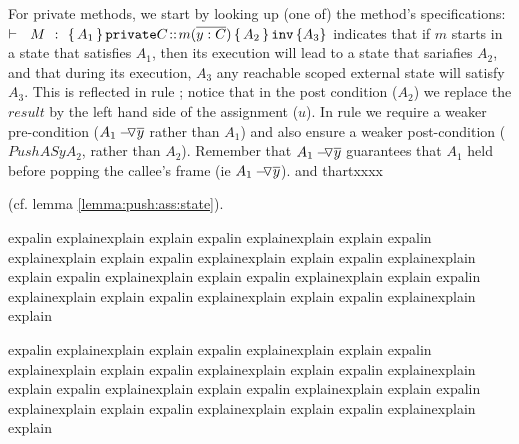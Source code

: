 {%
For private methods, we start by  looking up (one of) the method's specifications: $ \promises  M {\mprepostN{A_1}{\prg{private} C}{m}{y}{C}{A_2} {A_3}}  $  indicates that if $m$ starts in a state that satisfies $A_1$, then  its execution will lead to a state that sariafies $A_2$, and
that during its execution, $A_3$  any reachable scoped external state will satisfy $A_3$.
This is reflected  in rule {};  notice that in the post condition ($A_2$) we replace the $result$ by the left hand side of the assignment ($u$).
In rule  {} we require a weaker pre-condition ($  \PushAS {y}{A_1}$  rather than $A_1$) and also ensure a weaker post-condition ($ PushAS {y}{A_2}$, rather than $A_2$).
Remember that $  \PushAS {y}{A_1}$ guarantees that $A_1$ held before popping the callee's frame (ie $  \PushAS {y}{A_1}$). and thartxxxx


(cf.  lemma \ref{lemma:push:ass:state}).

%

expalin explainexplain explain expalin explainexplain explain expalin explainexplain explain expalin explainexplain explain
expalin explainexplain explain expalin explainexplain explain expalin explainexplain explain expalin explainexplain explain
expalin explainexplain explain expalin explainexplain explain

expalin explainexplain explain expalin explainexplain explain expalin explainexplain explain expalin explainexplain explain
expalin explainexplain explain expalin explainexplain explain expalin explainexplain explain expalin explainexplain explain
expalin explainexplain explain expalin explainexplain explain

}
